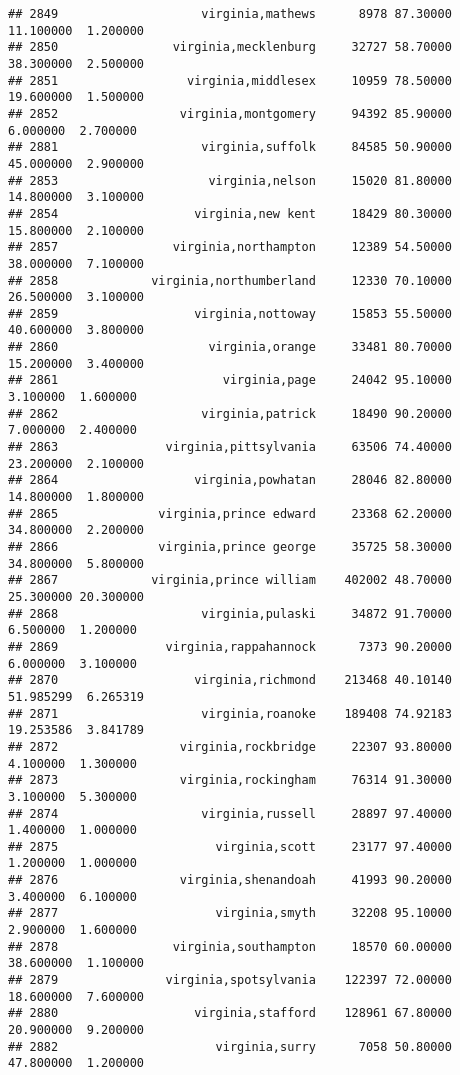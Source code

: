 \documentclass[
]{article}
\begin{document}
\begin{verbatim}
## 2849                    virginia,mathews      8978 87.30000 11.100000  1.200000
## 2850                virginia,mecklenburg     32727 58.70000 38.300000  2.500000
## 2851                  virginia,middlesex     10959 78.50000 19.600000  1.500000
## 2852                 virginia,montgomery     94392 85.90000  6.000000  2.700000
## 2881                    virginia,suffolk     84585 50.90000 45.000000  2.900000
## 2853                     virginia,nelson     15020 81.80000 14.800000  3.100000
## 2854                   virginia,new kent     18429 80.30000 15.800000  2.100000
## 2857                virginia,northampton     12389 54.50000 38.000000  7.100000
## 2858             virginia,northumberland     12330 70.10000 26.500000  3.100000
## 2859                   virginia,nottoway     15853 55.50000 40.600000  3.800000
## 2860                     virginia,orange     33481 80.70000 15.200000  3.400000
## 2861                       virginia,page     24042 95.10000  3.100000  1.600000
## 2862                    virginia,patrick     18490 90.20000  7.000000  2.400000
## 2863               virginia,pittsylvania     63506 74.40000 23.200000  2.100000
## 2864                   virginia,powhatan     28046 82.80000 14.800000  1.800000
## 2865              virginia,prince edward     23368 62.20000 34.800000  2.200000
## 2866              virginia,prince george     35725 58.30000 34.800000  5.800000
## 2867             virginia,prince william    402002 48.70000 25.300000 20.300000
## 2868                    virginia,pulaski     34872 91.70000  6.500000  1.200000
## 2869               virginia,rappahannock      7373 90.20000  6.000000  3.100000
## 2870                   virginia,richmond    213468 40.10140 51.985299  6.265319
## 2871                    virginia,roanoke    189408 74.92183 19.253586  3.841789
## 2872                 virginia,rockbridge     22307 93.80000  4.100000  1.300000
## 2873                 virginia,rockingham     76314 91.30000  3.100000  5.300000
## 2874                    virginia,russell     28897 97.40000  1.400000  1.000000
## 2875                      virginia,scott     23177 97.40000  1.200000  1.000000
## 2876                 virginia,shenandoah     41993 90.20000  3.400000  6.100000
## 2877                      virginia,smyth     32208 95.10000  2.900000  1.600000
## 2878                virginia,southampton     18570 60.00000 38.600000  1.100000
## 2879               virginia,spotsylvania    122397 72.00000 18.600000  7.600000
## 2880                   virginia,stafford    128961 67.80000 20.900000  9.200000
## 2882                      virginia,surry      7058 50.80000 47.800000  1.200000

\end{verbatim}
\end{document}
